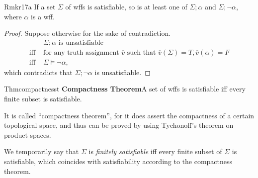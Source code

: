 \begin{reference}{Rmk}{r17a}
  If a set $\Sigma$ of wffs is satisfiable, so is at least one of $\Sigma;\alpha$ and $\Sigma;\neg \alpha$, where $\alpha$ is a wff.
\end{reference}

\begin{proof}
  Suppose otherwise for the sake of contradiction.
  \begin{align*}
                & \Sigma;\alpha\text{ is unsatisfiable } \\\text{iff }&\text{for any truth assignment $\overline{v}$ such that $\overline{v}(\Sigma)=T, \overline{v}(\alpha)=F$} \\
    \text{iff } & \Sigma\vDash\neg \alpha,
  \end{align*}
  which contradicts that $\Sigma;\neg\alpha$ is unsatisfiable.
\end{proof}


\begin{reference}{Thm}{compactnesst}
  \textbf{Compactness Theorem}\quad A set of wffs is satisfiable iff every finite subset is satisfiable.
\end{reference}

It is called ``compactness theorem'', for it does assert the compactness of a certain topological space, and thus can be proved by using Tychonoff’s theorem on product spaces.


We temporarily say that $\Sigma$ is \textit{finitely satisfiable} iff every finite subset of $\Sigma$ is satisfiable, which coincides with satisfiability according to the compactness theorem.

